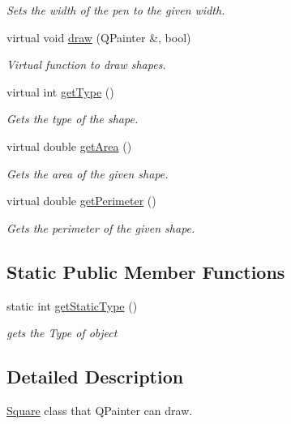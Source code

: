 \begin{DoxyCompactItemize}
\begin{DoxyCompactList}\small\item\em Sets the width of the pen to the given width. \end{DoxyCompactList}\item 
virtual void \hyperlink{classSquare_acea142797dc1540a4fea5d343b7f1e82}{draw} (Q\+Painter \&, bool)
\begin{DoxyCompactList}\small\item\em Virtual function to draw shapes. \end{DoxyCompactList}\item 
virtual int \hyperlink{classSquare_a1d225d79fc799bc98f9ad4d23e33a7d2}{get\+Type} ()
\begin{DoxyCompactList}\small\item\em Gets the type of the shape. \end{DoxyCompactList}\item 
virtual double \hyperlink{classSquare_a9a97feb159f85721b661b10ace6a8b3b}{get\+Area} ()
\begin{DoxyCompactList}\small\item\em Gets the area of the given shape. \end{DoxyCompactList}\item 
virtual double \hyperlink{classSquare_ae1d360c45a7970da83c3ad2acbf81dc2}{get\+Perimeter} ()
\begin{DoxyCompactList}\small\item\em Gets the perimeter of the given shape. \end{DoxyCompactList}\end{DoxyCompactItemize}
\subsection*{Static Public Member Functions}
\begin{DoxyCompactItemize}
\item 
static int \hyperlink{classSquare_a5d6e510d07f465fefdd1cdbbd041db2f}{get\+Static\+Type} ()
\begin{DoxyCompactList}\small\item\em gets the Type of object \end{DoxyCompactList}\end{DoxyCompactItemize}


\subsection{Detailed Description}
\hyperlink{classSquare}{Square} class that Q\+Painter can draw. 

